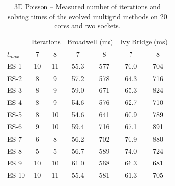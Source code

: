 \begin{table}
	\caption[3D Poisson -- Number of iterations and solving times of the evolved methods]{3D Poisson -- Measured number of iterations and solving times of the evolved multigrid methods on 20 cores and two sockets.}
	\label{table:poisson-3D-evolved-methods}
	\centering
	\begin{tabular}{l c c c c c c}
		\toprule
		& \multicolumn{2}{c}{Iterations} & \multicolumn{2}{c}{Broadwell (ms)} & \multicolumn{2}{c}{Ivy Bridge (ms)} \\
		\cmidrule(r){2-3} \cmidrule(r){4-5} \cmidrule(r){6-7}
		$l_{max}$ & $7$& $8$ & $7$ & $8$ & $7$ & $8$\\
		\midrule
		ES-1 & 10 & 11 & 55.3 & 577 & 70.0 & 704\\
		\midrule
		ES-2 & 8 & 9 & 57.2 & 578 & 64.3 & 716 \\
		\midrule
		ES-3 & 8 & 9 & 59.0 & 671 & 65.3 & 824 \\
		\midrule
		ES-4 & 8 & 9 & 54.6 & 576 & 62.7 & 710 \\
		\midrule
		ES-5 & 8 & 10 & 54.6 & 641 & 60.9 & 789 \\
		\midrule
		ES-6 & 9 & 10 & 59.4 & 716 & 67.1 & 891 \\
		\midrule
		ES-7 & 6 & 8 & 56.2 & 702 & 70.9 & 880 \\
		\midrule
		ES-8 & 5 & 5 & 56.7 & 589 & 74.0 & 724 \\
		\midrule
		ES-9 & 10 & 10 & 61.0 & 568 & 66.3 & 681 \\
		\midrule
		ES-10 & 10 & 11 & 55.4 & 581 & 61.3 & 705 \\
		\bottomrule
	\end{tabular}
\end{table}
